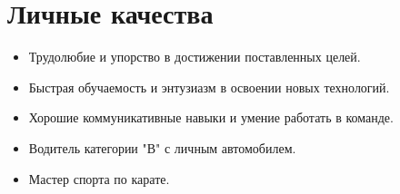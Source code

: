 \documentclass[a4paper,10pt]{article}
\begin{document}
\vspace{0.5cm}

\section*{Личные качества}

\begin{itemize}
    \item Трудолюбие и упорство в достижении поставленных целей.
    \item Быстрая обучаемость и энтузиазм в освоении новых технологий.
    \item Хорошие коммуникативные навыки и умение работать в команде.
    \item Водитель категории "В" с личным автомобилем.
    \item Мастер спорта по карате.
\end{itemize}
\end{document}
